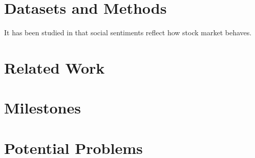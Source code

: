 \documentclass[a4paper, 11pt]{article}
\begin{document}
\begin{spacing}{1}
    \section{Datasets and Methods}
    It has been studied in \cite{social_relation_sentiment_analysis} that social sentiments reflect how stock market behaves. 
    
    \section{Related Work}
    \cite{cs229_stanford_portfolio}
    
    \section{Milestones}
    
    \section{Potential Problems} 
  
  \end{spacing}  
  
  
\end{document}
